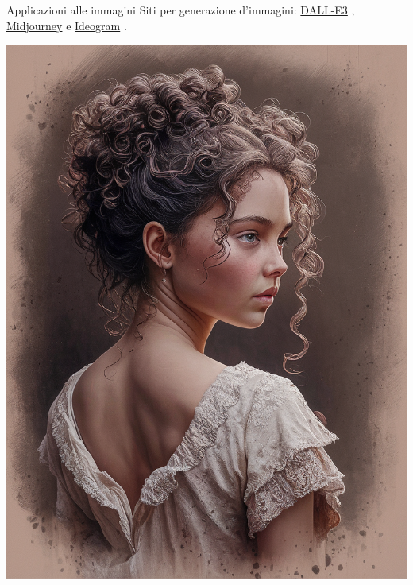\documentclass[aspectratio=169]{beamer}
\begin{document}
\begin{frame}{Applicazioni alle immagini}
    Siti per generazione d'immagini: \href{https://openai.com/index/dall-e-3/}{DALL-E3} , \href{https://www.midjourney.com/home}{Midjourney}   e \href{https://ideogram.ai/t/top/1}{Ideogram} .
        \begin{center}
            \begin{minipage}{0.23\textwidth}
                \includegraphics[height=0.7\textheight, width=\textwidth]{ideogram1.png}

\end{minipage}
\end{center}
\end{frame}
\end{document}
